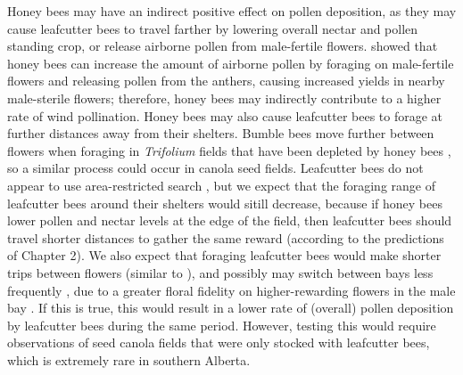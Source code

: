 \documentclass[12pt]{article} %
\begin{document}

Honey bees may have an indirect positive effect on pollen deposition, as they may cause leafcutter bees to travel farther by lowering overall nectar and pollen standing crop, or release airborne pollen from male-fertile flowers.
\citet{pierre2010} showed that honey bees can increase the amount of airborne pollen by foraging on male-fertile flowers and releasing pollen from the anthers, causing increased yields in nearby male-sterile flowers; therefore, honey bees may indirectly contribute to a higher rate of wind pollination.
Honey bees may also cause leafcutter bees to forage at further distances away from their shelters.
Bumble bees move further between flowers when foraging in \textit{Trifolium} fields that have been depleted by honey bees \citet{heinrich1979}, so a similar process could occur in canola seed fields. 
Leafcutter bees do not appear to use area-restricted search \citep{brunet2019}, but we expect that the foraging range of leafcutter bees around their shelters would sitill decrease, because if honey bees lower pollen and nectar levels at the edge of the field, then leafcutter bees should travel shorter distances to gather the same reward (according to the predictions of Chapter 2).
We also expect that foraging leafcutter bees would make shorter trips between flowers (similar to \citealp{heinrich1979}), and possibly may switch between bays less frequently \citep{waytesMsc,gaffney2019}, due to a greater floral fidelity on higher-rewarding flowers in the male bay \citep{mesquida1978}.
If this is true, this would result in a lower rate of (overall) pollen deposition by leafcutter bees during the same period.
However, testing this would require observations of seed canola fields that were only stocked with leafcutter bees, which is extremely rare in southern Alberta.
\end{document}
